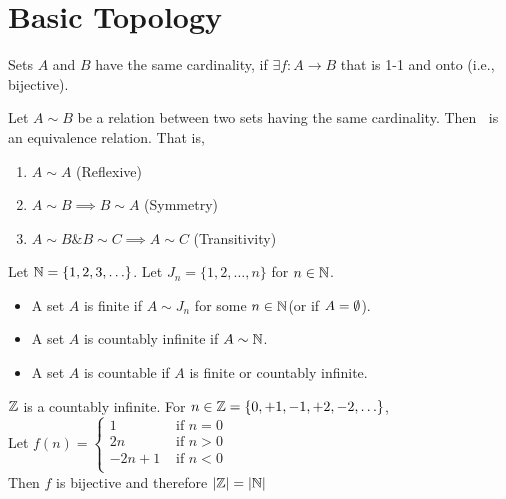 \chapter{Basic Topology}


\begin{definition}
	Sets $A$ and $B$ have the same cardinality, if $\exists f: A \to B$ that is 1-1 and onto (i.e., bijective).
\end{definition}

\begin{theorem}
	Let $A\sim B$ be a relation between two sets having the same cardinality. Then $~$ is an equivalence relation. That is,
	\begin{enumerate}
		\item $A\sim A$ (Reflexive)
		\item $A\sim B \implies B\sim A$ (Symmetry)
		\item $A\sim B \& B\sim C\implies A \sim C$ (Transitivity)
	\end{enumerate}
\end{theorem}
\begin{definition}
	Let $\mathbb{N} =\{1,2,3,\ldots\}$. Let $J_{n}=\{1,2,\ldots,n\}$ for $n \in \mathbb{N} $.
	\begin{itemize}
		\item A set $A$ is finite if $A\sim J_{n}$ for some $n \in \mathbb{N} $(or if $A=\emptyset $).
		\item A set $A$ is countably infinite if $A\sim \mathbb{N} $.
		\item A set $A$ is countable if $A$ is finite or countably infinite.
	\end{itemize}
\end{definition}
\begin{example}
	$\mathbb{Z} $ is a countably infinite.
	For $n \in \mathbb{Z}=\{0,+1,-1,+2,-2,\ldots\}$, \\
	Let $f(n)=\begin{cases}
			1      & \text{ if $n=0$} \\
			2n     & \text{ if $n>0$} \\
			-2n +1 & \text{ if $n<0$} \\
		\end{cases}$\\
	Then $f$ is bijective and therefore $|\mathbb{Z}|=|\mathbb{N}|$
\end{example}

